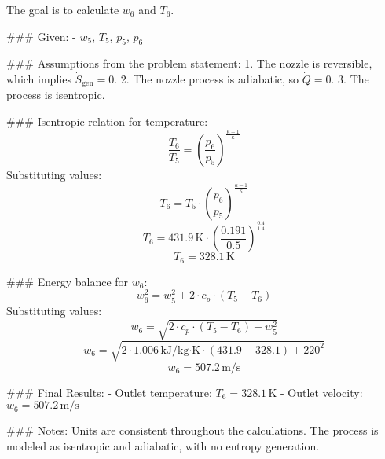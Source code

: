 The goal is to calculate \( w_6 \) and \( T_6 \).  

### Given:  
- \( w_5 \), \( T_5 \), \( p_5 \), \( p_6 \)  

### Assumptions from the problem statement:  
1. The nozzle is reversible, which implies \( \dot{S}_{\text{gen}} = 0 \).  
2. The nozzle process is adiabatic, so \( \dot{Q} = 0 \).  
3. The process is isentropic.  

### Isentropic relation for temperature:  
\[
\frac{T_6}{T_5} = \left( \frac{p_6}{p_5} \right)^{\frac{\kappa - 1}{\kappa}}
\]  
Substituting values:  
\[
T_6 = T_5 \cdot \left( \frac{p_6}{p_5} \right)^{\frac{\kappa - 1}{\kappa}}
\]  
\[
T_6 = 431.9 \, \text{K} \cdot \left( \frac{0.191}{0.5} \right)^{\frac{0.4}{1.4}}
\]  
\[
T_6 = 328.1 \, \text{K}
\]  

### Energy balance for \( w_6 \):  
\[
w_6^2 = w_5^2 + 2 \cdot c_p \cdot (T_5 - T_6)
\]  
Substituting values:  
\[
w_6 = \sqrt{2 \cdot c_p \cdot (T_5 - T_6) + w_5^2}
\]  
\[
w_6 = \sqrt{2 \cdot 1.006 \, \text{kJ/kg·K} \cdot (431.9 - 328.1) + 220^2}
\]  
\[
w_6 = 507.2 \, \text{m/s}
\]  

### Final Results:  
- Outlet temperature: \( T_6 = 328.1 \, \text{K} \)  
- Outlet velocity: \( w_6 = 507.2 \, \text{m/s} \)  

### Notes:  
Units are consistent throughout the calculations. The process is modeled as isentropic and adiabatic, with no entropy generation.